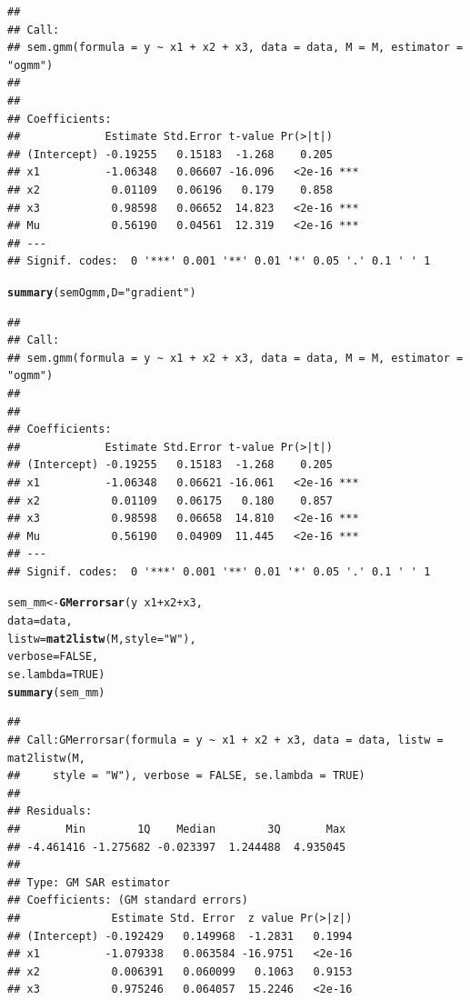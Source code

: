 \documentclass[english,12pt]{book}\usepackage[]{graphicx}\usepackage[]{xcolor}
\makeatletter
\newcommand{\hlnum}[1]{\textcolor[rgb]{0.686,0.059,0.569}{#1}}%
\newcommand{\hlsng}[1]{\textcolor[rgb]{0.192,0.494,0.8}{#1}}%
\newcommand{\hlopt}[1]{\textcolor[rgb]{0,0,0}{#1}}%
\newcommand{\hldef}[1]{\textcolor[rgb]{0.345,0.345,0.345}{#1}}%
\newcommand{\hlkwb}[1]{\textcolor[rgb]{0.69,0.353,0.396}{#1}}%
\newcommand{\hlkwc}[1]{\textcolor[rgb]{0.333,0.667,0.333}{#1}}%
\newcommand{\hlkwd}[1]{\textcolor[rgb]{0.737,0.353,0.396}{\textbf{#1}}}%
\newenvironment{kframe}{%
 \def\at@end@of@kframe{}%
 \ifinner\ifhmode%
  \def\at@end@of@kframe{\end{minipage}}%
  \begin{minipage}{\columnwidth}%
 \fi\fi%
 \def\FrameCommand##1{\hskip\@totalleftmargin \hskip-\fboxsep
 \colorbox{shadecolor}{##1}\hskip-\fboxsep
     \hskip-\linewidth \hskip-\@totalleftmargin \hskip\columnwidth}%
 \MakeFramed {\advance\hsize-\width
   \@totalleftmargin\z@ \linewidth\hsize
   \@setminipage}}%
 {\par\unskip\endMakeFramed%
 \at@end@of@kframe}
\newenvironment{knitrout}{}{} %
\let\hlstd\hldef
\let\hlstr\hlsng
\makeatother
\begin{document}
\begin{knitrout}
\begin{kframe}
\begin{verbatim}
## 
## Call:
## sem.gmm(formula = y ~ x1 + x2 + x3, data = data, M = M, estimator = "ogmm")
## 
## 
## Coefficients:
##             Estimate Std.Error t-value Pr(>|t|)    
## (Intercept) -0.19255   0.15183  -1.268    0.205    
## x1          -1.06348   0.06607 -16.096   <2e-16 ***
## x2           0.01109   0.06196   0.179    0.858    
## x3           0.98598   0.06652  14.823   <2e-16 ***
## Mu           0.56190   0.04561  12.319   <2e-16 ***
## ---
## Signif. codes:  0 '***' 0.001 '**' 0.01 '*' 0.05 '.' 0.1 ' ' 1
\end{verbatim}
\begin{alltt}
\hlkwd{summary}\hlstd{(semOgmm,} \hlkwc{D} \hlstd{=} \hlstr{"gradient"}\hlstd{)}
\end{alltt}
\begin{verbatim}
## 
## Call:
## sem.gmm(formula = y ~ x1 + x2 + x3, data = data, M = M, estimator = "ogmm")
## 
## 
## Coefficients:
##             Estimate Std.Error t-value Pr(>|t|)    
## (Intercept) -0.19255   0.15183  -1.268    0.205    
## x1          -1.06348   0.06621 -16.061   <2e-16 ***
## x2           0.01109   0.06175   0.180    0.857    
## x3           0.98598   0.06658  14.810   <2e-16 ***
## Mu           0.56190   0.04909  11.445   <2e-16 ***
## ---
## Signif. codes:  0 '***' 0.001 '**' 0.01 '*' 0.05 '.' 0.1 ' ' 1
\end{verbatim}
\begin{alltt}
\hlstd{sem_mm}    \hlkwb{<-} \hlkwd{GMerrorsar}\hlstd{(y} \hlopt{~} \hlstd{x1} \hlopt{+} \hlstd{x2} \hlopt{+} \hlstd{x3,}
                        \hlkwc{data} \hlstd{= data,}
                        \hlkwc{listw} \hlstd{=} \hlkwd{mat2listw}\hlstd{(M,} \hlkwc{style} \hlstd{=} \hlstr{"W"}\hlstd{),}
                        \hlkwc{verbose} \hlstd{=} \hlnum{FALSE}\hlstd{,}
                        \hlkwc{se.lambda} \hlstd{=} \hlnum{TRUE}\hlstd{)}
\hlkwd{summary}\hlstd{(sem_mm)}
\end{alltt}
\begin{verbatim}
## 
## Call:GMerrorsar(formula = y ~ x1 + x2 + x3, data = data, listw = mat2listw(M, 
##     style = "W"), verbose = FALSE, se.lambda = TRUE)
## 
## Residuals:
##       Min        1Q    Median        3Q       Max 
## -4.461416 -1.275682 -0.023397  1.244488  4.935045 
## 
## Type: GM SAR estimator
## Coefficients: (GM standard errors) 
##              Estimate Std. Error  z value Pr(>|z|)
## (Intercept) -0.192429   0.149968  -1.2831   0.1994
## x1          -1.079338   0.063584 -16.9751   <2e-16
## x2           0.006391   0.060099   0.1063   0.9153
## x3           0.975246   0.064057  15.2246   <2e-16

\end{verbatim}
\end{kframe}
\end{knitrout}
\end{document}
